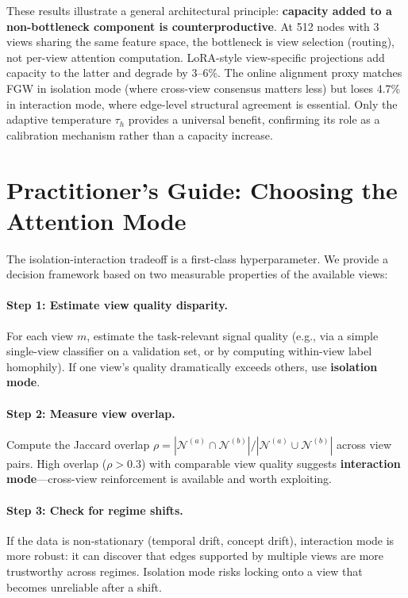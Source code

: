 \documentclass[11pt,a4paper]{article}
\newcommand{\calN}{\mathcal{N}}
\begin{document}
These results illustrate a general architectural principle:
\textbf{capacity added to a non-bottleneck component is
counterproductive}.
At 512 nodes with 3 views sharing the same feature space, the
bottleneck is view selection (routing), not per-view attention
computation.
LoRA-style view-specific projections add capacity to the latter and
degrade by 3--6\%.
The online alignment proxy matches FGW in isolation mode (where
cross-view consensus matters less) but loses 4.7\% in interaction mode,
where edge-level structural agreement is essential.
Only the adaptive temperature $\tau_h$ provides a universal benefit,
confirming its role as a calibration mechanism rather than a capacity
increase.


\section{Practitioner's Guide: Choosing the Attention Mode}
\label{sec:guide}

The isolation-interaction tradeoff is a first-class hyperparameter.
We provide a decision framework based on two measurable properties of
the available views:

\paragraph{Step 1: Estimate view quality disparity.}
For each view $m$, estimate the task-relevant signal quality (e.g., via
a simple single-view classifier on a validation set, or by computing
within-view label homophily).
If one view's quality dramatically exceeds others, use
\textbf{isolation mode}.

\paragraph{Step 2: Measure view overlap.}
Compute the Jaccard overlap
$\rho = |\calN^{(a)} \cap \calN^{(b)}| / |\calN^{(a)} \cup \calN^{(b)}|$
across view pairs.
High overlap ($\rho > 0.3$) with comparable view quality suggests
\textbf{interaction mode}---cross-view reinforcement is available and
worth exploiting.

\paragraph{Step 3: Check for regime shifts.}
If the data is non-stationary (temporal drift, concept drift),
interaction mode is more robust: it can discover that edges supported by
multiple views are more trustworthy across regimes.
Isolation mode risks locking onto a view that becomes unreliable after
a shift.
\end{document}
